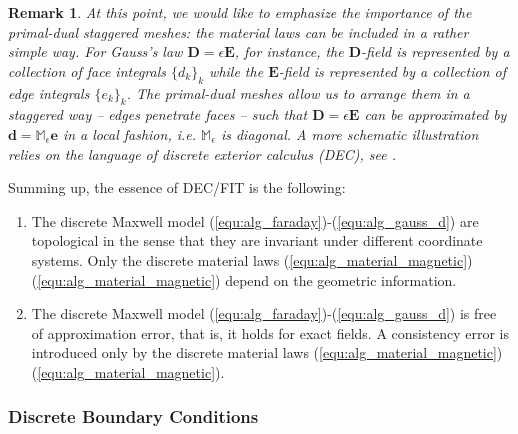 \documentclass{article}
\newtheorem*{remark}{Remark}
\begin{document}
\begin{remark}
  At this point, we would like to emphasize the importance of the primal-dual staggered
  meshes: \emph{the material laws can be included in a rather simple way.} For Gauss's law
  $\mathbf{D} = \epsilon \mathbf{E}$, for instance, the $\mathbf{D}$-field is represented
  by a collection of face integrals $ \{d_k\}_{k}$ while the $\mathbf{E}$-field is
  represented by a collection of edge integrals $ \{e_k\}_{k}$. The primal-dual meshes
  allow us to arrange them in a staggered way -- edges penetrate faces -- such that
  $\mathbf{D} = \epsilon \mathbf{E}$ can be approximated by
  $\mathbf{d} = \mathbb{M}_{\epsilon}\mathbf{e}$ in a local fashion,
  i.e. $\mathbb{M}_{\epsilon}$ is diagonal. A more schematic illustration relies on the
  language of discrete exterior calculus (DEC), see \cite{bossavit1999, teixeira_1999,
    hip_1999}.
\end{remark}

Summing up, the essence of DEC/FIT is the following:
\begin{enumerate}[label={(\roman{*})}]
\item The discrete Maxwell model (\ref{equ:alg_faraday})-(\ref{equ:alg_gauss_d}) are
  topological in the sense that they are invariant under different coordinate
  systems. Only the discrete material laws
  (\ref{equ:alg_material_magnetic})(\ref{equ:alg_material_magnetic}) depend on the
  geometric information.
\item The discrete Maxwell model (\ref{equ:alg_faraday})-(\ref{equ:alg_gauss_d}) is free
  of approximation error, that is, it holds for exact fields. A consistency error is
  introduced only by the discrete material laws
  (\ref{equ:alg_material_magnetic})(\ref{equ:alg_material_magnetic}).
\end{enumerate}

\subsubsection{Discrete Boundary Conditions}
\end{document}
